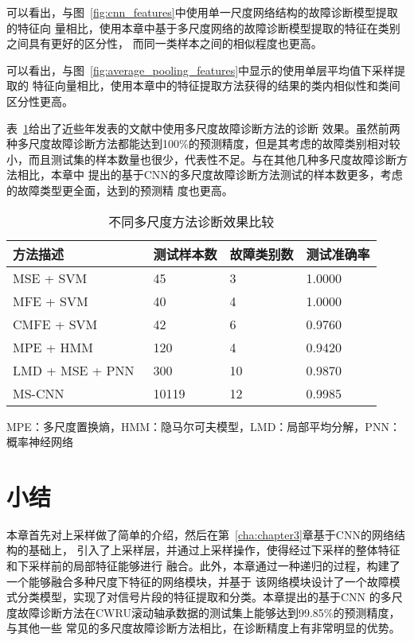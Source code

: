 可以看出，与图~\ref{fig:cnn_features}中使用单一尺度网络结构的故障诊断模型提取的特征向
量相比，使用本章中基于多尺度网络的故障诊断模型提取的特征在类别之间具有更好的区分性，
而同一类样本之间的相似程度也更高。

可以看出，与图~\ref{fig:average_pooling_features}中显示的使用单层平均值下采样提取的
特征向量相比，使用本章中的特征提取方法获得的结果的类内相似性和类间区分性更高。

表~\ref{tab:chap4:ref_comparison}给出了近些年发表的文献中使用多尺度故障诊断方法的诊断
效果。虽然前两种多尺度故障诊断方法都能达到100\%的预测精度，但是其考虑的故障类别相对较
小，而且测试集的样本数量也很少，代表性不足。与在其他几种多尺度故障诊断方法相比，本章中
提出的基于CNN的多尺度故障诊断方法测试的样本数更多，考虑的故障类型更全面，达到的预测精
度也更高。
\begin{table}[htb]
  \centering
  \begin{minipage}[t]{0.9\linewidth}
  \caption{不同多尺度方法诊断效果比较}
  \label{tab:chap4:ref_comparison}
    \begin{tabularx}{\linewidth}{lXXX}
      \toprule[1.5pt]
        方法描述 & 测试样本数 & 故障类别数 & 测试准确率 \\
      \midrule[1pt]
        MSE + SVM~\cite{zhengjinde2012mse}     & 45    & 3  & 1.0000 \\
        MFE + SVM~\cite{zhengjinde2014mfe}     & 40    & 4  & 1.0000 \\
        CMFE + SVM~\cite{zhengjinde2016cmfe}   & 42    & 6  & 0.9760 \\
        MPE + HMM~\cite{zhao2015rolling}       & 120   & 4  & 0.9420 \\
        LMD + MSE + PNN~\cite{mengzong2016lmd} & 300   & 10 & 0.9870 \\
        MS-CNN                                 & 10119 & 12 & 0.9985 \\
      \bottomrule[1.5pt]
    \end{tabularx}
    \footnotesize
    MPE：多尺度置换熵，HMM：隐马尔可夫模型，LMD：局部平均分解，PNN：概率神经网络
  \end{minipage}
\end{table}

\section{小结}

本章首先对上采样做了简单的介绍，然后在第~\ref{cha:chapter3}章基于CNN的网络结构的基础上，
引入了上采样层，并通过上采样操作，使得经过下采样的整体特征和下采样前的局部特征能够进行
融合。此外，本章通过一种递归的过程，构建了一个能够融合多种尺度下特征的网络模块，并基于
该网络模块设计了一个故障模式分类模型，实现了对信号片段的特征提取和分类。本章提出的基于CNN
的多尺度故障诊断方法在CWRU滚动轴承数据的测试集上能够达到99.85\%的预测精度，与其他一些
常见的多尺度故障诊断方法相比，在诊断精度上有非常明显的优势。
